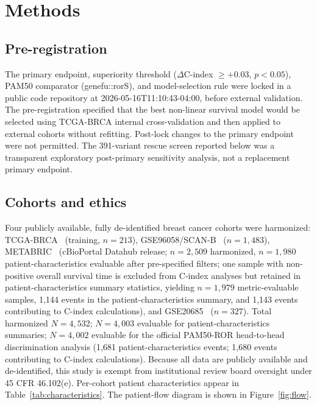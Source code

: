 \documentclass[11pt,letterpaper]{article}
\begin{document}

\section*{Methods}

\subsection*{Pre-registration}

The primary endpoint, superiority threshold ($\Delta$C-index $\geq +0.03$, $p < 0.05$), PAM50 comparator (genefu::rorS), and model-selection rule were locked in a public code repository at 2026-05-16T11:10:43-04:00, before external validation. The pre-registration specified that the best non-linear survival model would be selected using TCGA-BRCA internal cross-validation and then applied to external cohorts without refitting. Post-lock changes to the primary endpoint were not permitted. The 391-variant rescue screen reported below was a transparent exploratory post-primary sensitivity analysis, not a replacement primary endpoint.

\subsection*{Cohorts and ethics}

Four publicly available, fully de-identified breast cancer cohorts were harmonized: TCGA-BRCA~\cite{tcga2012comprehensive} (training, $n = 213$), GSE96058/SCAN-B~\cite{saal2015scanb,brueffer2018clinical} ($n = 1{,}483$), METABRIC~\cite{curtis2012genomic,pereira2016somatic} (cBioPortal Datahub release; $n = 2{,}509$ harmonized, $n = 1{,}980$ patient-characteristics evaluable after pre-specified filters; one sample with non-positive overall survival time is excluded from C-index analyses but retained in patient-characteristics summary statistics, yielding $n = 1{,}979$ metric-evaluable samples, 1,144 events in the patient-characteristics summary, and 1,143 events contributing to C-index calculations), and GSE20685~\cite{kao2011correlation} ($n = 327$). Total harmonized $N = 4{,}532$; $N = 4{,}003$ evaluable for patient-characteristics summaries; $N = 4{,}002$ evaluable for the official PAM50-ROR head-to-head discrimination analysis (1,681 patient-characteristics events; 1,680 events contributing to C-index calculations). Because all data are publicly available and de-identified, this study is exempt from institutional review board oversight under 45 CFR 46.102(e). Per-cohort patient characteristics appear in Table~\ref{tab:characteristics}. The patient-flow diagram is shown in Figure~\ref{fig:flow}.
\end{document}
